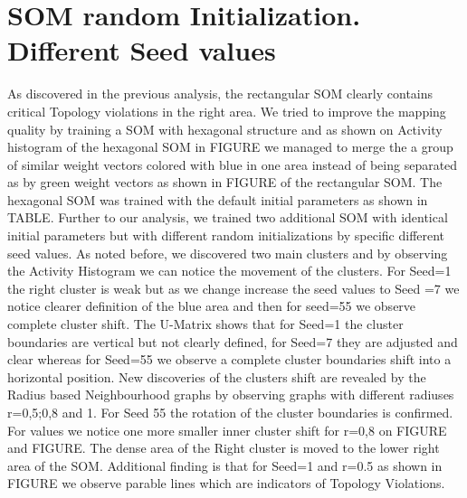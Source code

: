 \documentclass{acm_proc_article-sp}
\begin{document}
\section{SOM random Initialization. Different Seed values}

As discovered in the previous analysis, the rectangular SOM clearly contains critical Topology 
violations in the right area. We tried to improve the mapping quality by training a SOM 
with hexagonal structure and as shown on Activity histogram of the hexagonal SOM in FIGURE 
we managed to merge the a group of similar weight vectors colored with blue in one area 
instead of being separated as by green weight vectors as shown in FIGURE of the rectangular SOM.
The hexagonal SOM was trained with the default initial parameters as shown in TABLE. Further
to our analysis, we trained two additional SOM with identical initial parameters but with 
different random initializations by specific different seed values. As noted before, we discovered
two main clusters and by observing the Activity Histogram we can notice the movement of the clusters.
For Seed=1 the right cluster is weak but as we change increase the seed values to Seed =7 we notice
clearer definition of the blue area and then for seed=55 we observe complete cluster shift.
The U-Matrix shows that for Seed=1 the cluster boundaries are vertical but not clearly defined,
for Seed=7 they are adjusted and clear whereas for Seed=55 we observe a complete cluster boundaries
shift into a horizontal position. New discoveries of the clusters shift are revealed by the
Radius based Neighbourhood graphs by observing graphs with different radiuses r=0,5;0,8 and 1. 
For Seed 55 the rotation of the cluster boundaries is confirmed. For values we notice 
one more smaller inner cluster shift for r=0,8 on FIGURE and FIGURE. The dense area of the Right 
cluster is moved to the lower right area of the SOM. Additional finding is that for Seed=1 and
r=0.5 as shown in FIGURE we observe parable lines which are indicators of Topology Violations.
\end{document}
